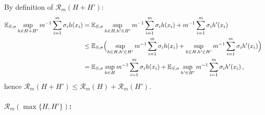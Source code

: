 \documentclass[a4paper]{article}
\newcommand{\ex}{\mathbb{E}}
\begin{document}
By definition of $\mathcal{R}_m(H+H')$:
\begin{align*}
  \ex_{S, \sigma} \sup_{h\in H+H'} m^{-1} \sum_{i=1}^m \sigma_i h(x_i)
    &= \ex_{S, \sigma}
      \sup_{h\in H, h'\in H'} m^{-1} \sum_{i=1}^m \sigma_i h(x_i)
                            + m^{-1} \sum_{i=1}^m \sigma_i h'(x_i) \\
    &\leq \ex_{S, \sigma} \Bigl(
            \sup_{h\in H, h'\in H'} m^{-1} \sum_{i=1}^m \sigma_i h(x_i)
          + \sup_{h\in H, h'\in H'} m^{-1} \sum_{i=1}^m \sigma_i h'(x_i)
        \Bigr)\\
    &= \ex_{S, \sigma} \sup_{h\in H} m^{-1} \sum_{i=1}^m \sigma_i h(x_i)
       + \ex_{S, \sigma} \sup_{h'\in H'} m^{-1} \sum_{i=1}^m \sigma_i h'(x_i) \,,
\end{align*}
hence $\mathcal{R}_m(H+H') \leq \mathcal{R}_m(H) + \mathcal{R}_m(H')$.


\paragraph{$\mathcal{R}_m(\max\{H, H'\})$:} %
\label{par:r_m_max_h_hh}
\end{document}
